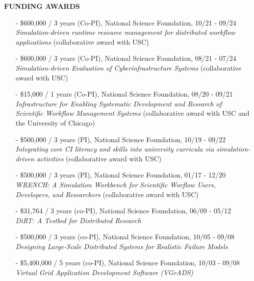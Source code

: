 \documentclass[times,11pt]{letter}
\begin{document}
\noindent
{\large{\bf FUNDING AWARDS}}
\begin{itemize}

\item[-] \$600,000 / 3 years (Co-PI), National Science Foundation, 10/21 - 09/24~\\
    {\it Simulation-driven runtime resource management for distributed workflow applications} (collaborative award with USC)


\item[-] \$600,000 / 3 years (Co-PI), National Science Foundation, 08/21 - 07/24~\\
    {\it Simulation-driven Evaluation of Cyberinfrastructure Systems} (collaborative award with USC)


\item[-] \$15,000 / 1 years (Co-PI), National Science Foundation, 08/20 - 09/21~\\
    {\it  Infrastructure for Enabling Systematic Development and Research of Scientific Workflow Management Systems} (collaborative award with USC and the University of Chicago)

\item[-] \$500,000 / 3 years (PI), National Science Foundation, 10/19 - 09/22~\\
    {\it Integrating core CI literacy and skills into university curricula via simulation-driven activities} (collaborative award with USC)


\item[-] \$500,000 / 3 years (PI), National Science Foundation, 01/17 - 12/20~\\
    {\it WRENCH: A Simulation Workbench for Scientific Worflow Users, Developers, and Researchers} (collaborative award with USC)

\item[-] \$31,764 / 3 years (co-PI), National Science Foundation, 06/09 - 05/12~\\
{\it DiRT: A Testbed for Distributed Research}

\item[-] \$500,000 / 3 years (co-PI), National Science Foundation, 10/05 - 09/08~\\
{\it Designing Large-Scale Distributed Systems for Realistic Failure Models}

\item[-] \$5,400,000 / 5 years (co-PI), National Science Foundation, 10/03 - 09/08~\\
        {\it Virtual Grid Application Development Software (VGrADS)}


\end{itemize}
\end{document}
